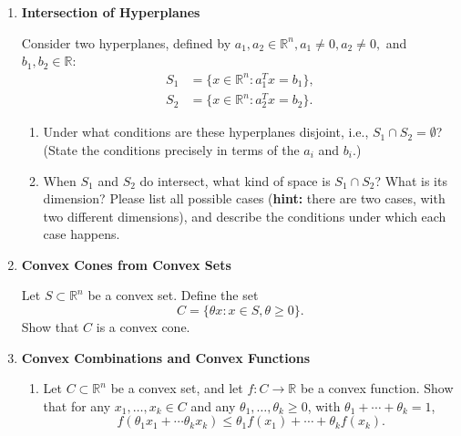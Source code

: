 \documentclass[11pt]{article}
\begin{document}
\begin{enumerate}
  Let $a \in \mathbb{R}^n, a \neq 0$, and $b \in \mathbb{R}$. Define the hyperplane
  $$S = \{x \in \mathbb{R}^n : a^T x = b\}.$$
  Give an expression for the point $x_0 \in S$ that is closest to the origin in Euclidean distance, or said another way, the point where the $L^2$ norm is minimal:
  $$x_0 = \arg \min_{x \in S} \|x\|_2.$$ {\bf Hint:} The formula for $x_0$ should be an expression in terms of $a$ and $b.$

\item {\bf Intersection of Hyperplanes}

  Consider two hyperplanes, defined by $a_1, a_2 \in \mathbb{R}^n, a_1 \neq 0, a_2 \neq 0,$ and $b_1, b_2 \in \mathbb{R}:$
  \begin{align*}
    S_1 &= \{ x \in \mathbb{R}^n : a_1^T x = b_1\}, \\
    S_2 &= \{ x \in \mathbb{R}^n : a_2^T x = b_2\}.
  \end{align*}

  \begin{enumerate}
    \item Under what conditions are these hyperplanes disjoint, i.e., $S_1 \cap S_2 = \emptyset$?
      (State the conditions precisely in terms of the $a_i$ and $b_i$.)

    \item When $S_1$ and $S_2$ do intersect, what kind of space is $S_1 \cap S_2$?
      What is its dimension? Please list all possible cases ({\bf hint:} there are two
      cases, with two different dimensions), and describe the conditions under which
      each case happens.

\end{enumerate}


\item {\bf Convex Cones from Convex Sets}
  
  Let $S \subset \mathbb{R}^n$ be a convex set. Define the set
  $$C = \{\theta x : x \in S, \theta \geq 0\}.$$
  Show that $C$ is a convex cone.

\item {\bf Convex Combinations and Convex Functions}

  \begin{enumerate}

  \item Let $C \subset \mathbb{R}^n$ be a convex set, and let $f : C \rightarrow \mathbb{R}$
    be a convex function. Show that for any $x_1, \ldots, x_k \in C$ and any
    $\theta_1, \ldots, \theta_k \geq 0$, with $\theta_1 + \cdots + \theta_k = 1$, 
    $$f(\theta_1 x_1 + \cdots \theta_k x_k) \leq \theta_1 f(x_1) + \cdots + \theta_k f(x_k).$$


\end{enumerate}
\end{enumerate}
\end{document}
